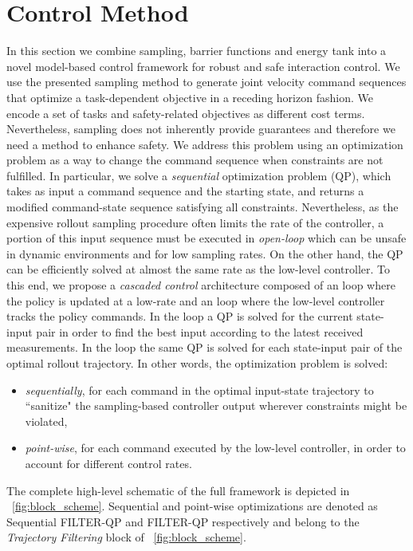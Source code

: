 \section{Control Method} \label{sec:control_method}

In this section we combine sampling, barrier functions and energy tank into a novel model-based control framework for robust and safe interaction control. We use the presented sampling method to generate joint velocity command sequences that optimize a task-dependent objective in a receding horizon fashion. We encode a set of tasks and safety-related objectives as different cost terms. Nevertheless, sampling does not inherently provide guarantees and therefore we need a method to enhance safety. We address this problem using an optimization problem as a  way to change the command sequence when constraints are not fulfilled. In particular, we solve a \textit{sequential} optimization problem (QP), which takes as input a command sequence and the starting state, and returns a modified command-state sequence satisfying all constraints. Nevertheless, as the expensive rollout sampling procedure often limits the rate of the controller, a portion of this input sequence must be executed in \textit{open-loop} which can be unsafe in dynamic environments and for low sampling rates. On the other hand, the QP can be efficiently solved at almost the same rate as the low-level controller. To this end, we propose a \emph{cascaded control} architecture composed of an  loop where the policy is updated at a low-rate and an  loop  where the low-level controller tracks the policy commands. In the  loop a QP is solved for the current state-input pair in order to find the best input according to the latest received measurements. In the  loop the same QP is solved for each state-input pair of the optimal rollout trajectory.
In other words, the optimization problem is solved:
\begin{itemize}
    \item \textit{sequentially}, for each command in the optimal input-state trajectory to ``sanitize" the sampling-based controller output wherever constraints might be violated,
    \item \textit{point-wise}, for each command executed by the low-level controller, in order to account for different control rates.
\end{itemize}
The complete high-level schematic of the full framework is depicted in \fig~\ref{fig:block_scheme}. Sequential and point-wise optimizations are denoted as Sequential FILTER-QP and FILTER-QP respectively and belong to the \textit{Trajectory Filtering} block of \fig~\ref{fig:block_scheme}. 

